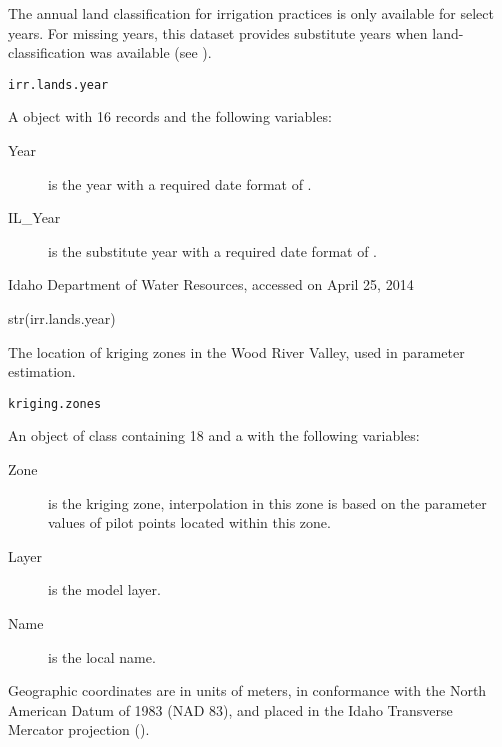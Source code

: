 \documentclass[letterpaper]{book}
\begin{document}
%
\begin{Description}\relax
The annual land classification for irrigation practices is only available for select years.
For missing years, this dataset provides substitute years when land-classification was available (see ).
\end{Description}
%
\begin{Usage}
\begin{verbatim}
irr.lands.year
\end{verbatim}
\end{Usage}
%
\begin{Format}
A  object with 16 records and the following variables:
\begin{description}

\item[Year] is the year with a required date format of .
\item[IL\_Year] is the substitute year with a required date format of .

\end{description}

\end{Format}
%
\begin{Source}\relax
Idaho Department of Water Resources, accessed on April 25, 2014
\end{Source}
%
\begin{Examples}
\begin{ExampleCode}
str(irr.lands.year)
\end{ExampleCode}
\end{Examples}
%
\begin{Description}\relax
The location of kriging zones in the Wood River Valley, used in parameter estimation.
\end{Description}
%
\begin{Usage}
\begin{verbatim}
kriging.zones
\end{verbatim}
\end{Usage}
%
\begin{Format}
An object of  class containing 18  and a  with the following variables:
\begin{description}

\item[Zone] is the kriging zone, interpolation in this zone is based on the parameter values of pilot points located within this zone.
\item[Layer] is the model layer.
\item[Name] is the local name.

\end{description}

Geographic coordinates are in units of meters, in conformance with the North American Datum of 1983 (NAD 83), and placed in the
Idaho Transverse Mercator projection ().
\end{Format}
\end{document}
